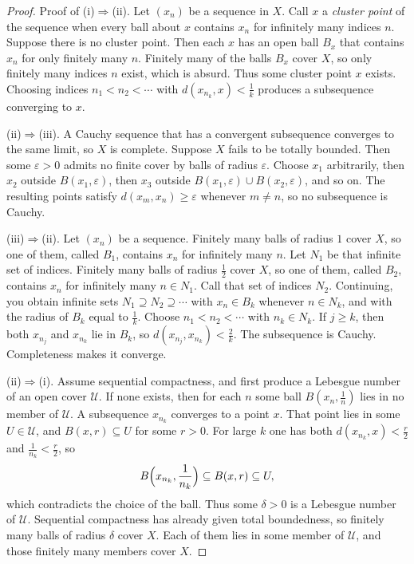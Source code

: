 \begin{proof}
Proof of (i)$\Rightarrow$(ii). Let $(x_n)$ be a sequence in $X$. Call $x$ a \emph{cluster point} of the sequence when every ball about $x$ contains $x_n$ for infinitely many indices $n$. Suppose there is no cluster point. Then each $x$ has an open ball $B_x$ that contains $x_n$ for only finitely many $n$. Finitely many of the balls $B_x$ cover $X$, so only finitely many indices $n$ exist, which is absurd. Thus some cluster point $x$ exists. Choosing indices $n_1<n_2<\cdots$ with $d(x_{n_k},x)<\frac1k$ produces a subsequence converging to $x$.

(ii)$\Rightarrow$(iii). A Cauchy sequence that has a convergent subsequence converges to the same limit, so $X$ is complete. Suppose $X$ fails to be totally bounded. Then some $\varepsilon>0$ admits no finite cover by balls of radius $\varepsilon$. Choose $x_1$ arbitrarily, then $x_2$ outside $B(x_1,\varepsilon)$, then $x_3$ outside $B(x_1,\varepsilon)\cup B(x_2,\varepsilon)$, and so on. The resulting points satisfy $d(x_m,x_n)\ge\varepsilon$ whenever $m\ne n$, so no subsequence is Cauchy.

(iii)$\Rightarrow$(ii). Let $(x_n)$ be a sequence. Finitely many balls of radius $1$ cover $X$, so one of them, called $B_1$, contains $x_n$ for infinitely many $n$. Let $N_1$ be that infinite set of indices. Finitely many balls of radius $\frac12$ cover $X$, so one of them, called $B_2$, contains $x_n$ for infinitely many $n\in N_1$. Call that set of indices $N_2$. Continuing, you obtain infinite sets $N_1\supseteq N_2\supseteq\cdots$ with $x_n\in B_k$ whenever $n\in N_k$, and with the radius of $B_k$ equal to $\frac1k$. Choose $n_1<n_2<\cdots$ with $n_k\in N_k$. If $j\ge k$, then both $x_{n_j}$ and $x_{n_k}$ lie in $B_k$, so $d(x_{n_j},x_{n_k})<\frac2k$. The subsequence is Cauchy. Completeness makes it converge.

(ii)$\Rightarrow$(i). Assume sequential compactness, and first produce a Lebesgue number of an open cover $\mathcal U$. If none exists, then for each $n$ some ball $B(x_n,\frac1n)$ lies in no member of $\mathcal U$. A subsequence $x_{n_k}$ converges to a point $x$. That point lies in some $U\in\mathcal U$, and $B(x,r)\subseteq U$ for some $r>0$. For large $k$ one has both $d(x_{n_k},x)<\frac r2$ and $\frac1{n_k}<\frac r2$, so
\[B\Bigl(x_{n_k},\frac1{n_k}\Bigr)\subseteq B(x,r)\subseteq U,\]
which contradicts the choice of the ball. Thus some $\delta>0$ is a Lebesgue number of $\mathcal U$. Sequential compactness has already given total boundedness, so finitely many balls of radius $\delta$ cover $X$. Each of them lies in some member of $\mathcal U$, and those finitely many members cover $X$.
\end{proof}

